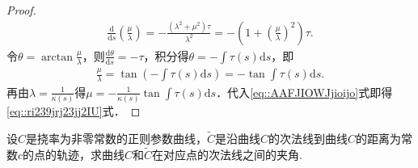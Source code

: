 \documentclass[../../main.tex]{subfiles}%
\begin{document}
\begin{proof}
\begin{align*}
\frac{\mathrm{d}}{\mathrm{d}s}\left(\frac{\mu}{\lambda}\right)=-\frac{(\lambda^2+\mu^2)\tau}{\lambda^2}=-\left(1+\left(\frac{\mu}{\lambda}\right)^2\right)\tau.
\end{align*}
令$\theta=\arctan\frac{\mu}{\lambda}$，则$\frac{\mathrm{d}\theta}{\mathrm{d}s}=-\tau$，积分得$\theta=-\int\tau(s)\mathrm{d}s$，即
\begin{align*}
\frac{\mu}{\lambda}=\tan\left(-\int\tau(s)\mathrm{d}s\right)=-\tan\int\tau(s)\mathrm{d}s.
\end{align*}
再由$\lambda=\frac{1}{\kappa(s)}$得$\mu=-\frac{1}{\kappa(s)}\tan\int\tau(s)\mathrm{d}s$．代入\eqref{eq::AAFJIOWJjioijo}式即得\eqref{eq::ri239jrj23jj2IU}式．
\end{proof}


\begin{example}
设$C$是挠率为非零常数的正则参数曲线，$\tilde{C}$是沿曲线$C$的次法线到曲线$C$的距离为常数$c$的点的轨迹，求曲线$C$和$\tilde{C}$在对应点的次法线之间的夹角.
\end{example}
\end{document}
